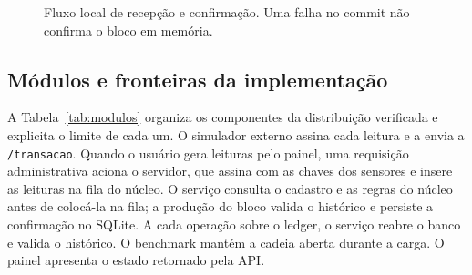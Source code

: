 \documentclass[10pt,a4paper,twocolumn]{article}
\begin{document}
\begin{figure}[t]
\centering
{}
\caption{Fluxo local de recepção e confirmação. Uma falha no commit não confirma o bloco em memória.}
\label{fig:fluxo}
\end{figure}

\subsection{Módulos e fronteiras da implementação}
A Tabela~\ref{tab:modulos} organiza os componentes da distribuição verificada e explicita o limite de cada um. O simulador externo assina cada leitura e a envia a \texttt{/transacao}. Quando o usuário gera leituras pelo painel, uma requisição administrativa aciona o servidor, que assina com as chaves dos sensores e insere as leituras na fila do núcleo. O serviço consulta o cadastro e as regras do núcleo antes de colocá-la na fila; a produção do bloco valida o histórico e persiste a confirmação no SQLite. A cada operação sobre o ledger, o serviço reabre o banco e valida o histórico. O benchmark mantém a cadeia aberta durante a carga. O painel apresenta o estado retornado pela API.
\end{document}

